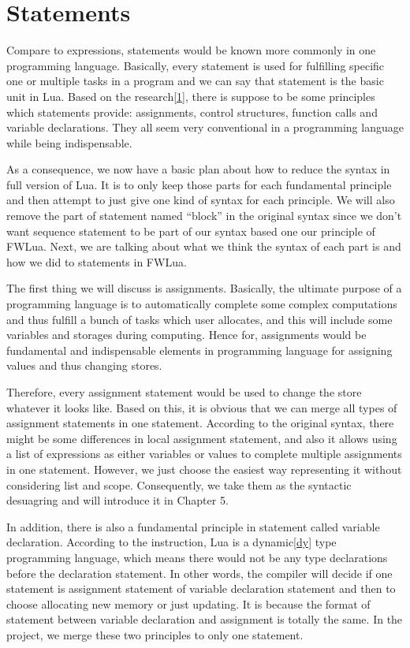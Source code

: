 \section{Statements}
Compare to expressions, statements would be known more commonly in one programming language. Basically, every statement is used for fulfilling specific one or multiple tasks in a program and we can say that statement is the basic unit in Lua. Based on the research\ref{1}, there is suppose to be some principles which statements provide: assignments, control structures, function calls and variable declarations. They all seem very conventional in a programming language while being indispensable. 

As a consequence, we now have a basic plan about how to reduce the syntax in full version of Lua. It is to only keep those parts for each fundamental principle and then attempt to just give one kind of syntax for each principle. We will also remove the part of statement named ``block'' in the original syntax since we don't want sequence statement to be part of our syntax based one our principle of FWLua. Next, we are talking about what we think the syntax of each part is and how we did to statements in FWLua. 

The first thing we will discuss is assignments. Basically, the ultimate purpose of a programming language is to automatically complete some complex computations and thus fulfill a bunch of tasks which user allocates, and this will include some variables and storages during computing. Hence for, assignments would be fundamental and indispensable elements in programming language for assigning values and thus changing stores. 

Therefore, every assignment statement would be used to change the store whatever it looks like. Based on this, it is obvious that we can merge all types of assignment statements in one statement. According to the original syntax, there might be some differences in local assignment statement, and also it allows using a list of expressions as either variables or values to complete multiple assignments in one statement. However, we just choose the easiest way representing it without considering list and scope. Consequently, we take them as the syntactic desuagring and will introduce it in Chapter 5.

In addition, there is also a fundamental principle in statement called variable declaration. According to the instruction, Lua is a dynamic\ref{dy} type programming language, which means there would not be any type declarations before the declaration statement. In other words, the compiler will decide if one statement is assignment statement of variable declaration statement and then to choose allocating new memory or just updating. It is because the format of statement between variable declaration and assignment is totally the same. In the project, we merge these two principles to only one statement.

